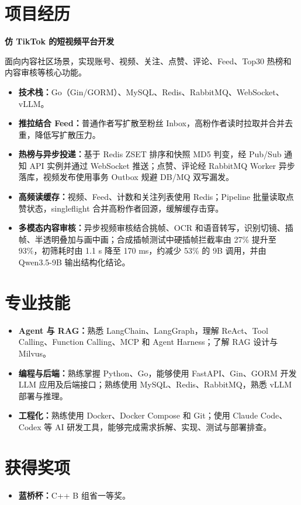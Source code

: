 \documentclass[a4paper,10pt]{ctexart}
\begin{document}
\section*{项目经历}
\textbf{仿 TikTok 的短视频平台开发}\par
面向内容社区场景，实现账号、视频、关注、点赞、评论、Feed、Top30 热榜和内容审核等核心功能。\par
\begin{itemize}
  \item \textbf{技术栈：}Go（Gin/GORM）、MySQL、Redis、RabbitMQ、WebSocket、vLLM。
  \item \textbf{推拉结合 Feed：}普通作者写扩散至粉丝 Inbox，高粉作者读时拉取并合并去重，降低写扩散压力。
  \item \textbf{热榜与异步投递：}基于 Redis ZSET 排序和快照 MD5 判变，经 Pub/Sub 通知 API 实例并通过 WebSocket 推送；点赞、评论经 RabbitMQ Worker 异步落库，视频发布使用事务 Outbox 规避 DB/MQ 双写漏发。
  \item \textbf{高频读缓存：}视频、Feed、计数和关注列表使用 Redis；Pipeline 批量读取点赞状态，singleflight 合并高粉作者回源，缓解缓存击穿。
  \item \textbf{多模态内容审核：}异步视频审核结合挑帧、OCR 和语音转写，识别切镜、插帧、半透明叠加与画中画；合成插帧测试中硬插帧拦截率由 27\% 提升至 93\%，初筛耗时由 1.1 s 降至 170 ms，约减少 53\% 的 9B 调用，并由 Qwen3.5-9B 输出结构化结论。
\end{itemize}



\section*{专业技能}
\begin{itemize}
  \item \textbf{Agent 与 RAG：}熟悉 LangChain、LangGraph，理解 ReAct、Tool Calling、Function Calling、MCP 和 Agent Harness；了解 RAG 设计与 Milvus。
  \item \textbf{编程与后端：}熟练掌握 Python、Go，能够使用 FastAPI、Gin、GORM 开发 LLM 应用及后端接口；熟练使用 MySQL、Redis、RabbitMQ，熟悉 vLLM 部署与推理。
  \item \textbf{工程化：}熟练使用 Docker、Docker Compose 和 Git；使用 Claude Code、Codex 等 AI 研发工具，能够完成需求拆解、实现、测试与部署排查。
\end{itemize}

\section*{获得奖项}
\begin{itemize}
  \item \textbf{蓝桥杯：}C++ B 组省一等奖。
\end{itemize}
\end{document}

